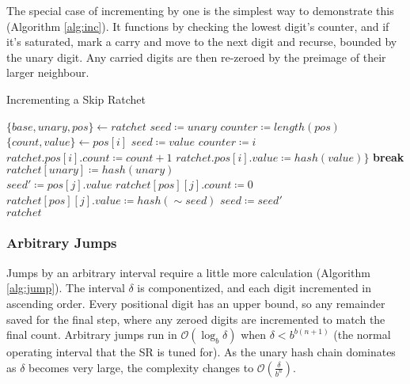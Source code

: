 \documentclass{article}
\begin{document}
	\FloatBarrier
	
	The special case of incrementing by one is the simplest way to demonstrate this (Algorithm \ref{alg:inc}). It functions by checking the lowest digit's counter, and if it's saturated, mark a carry and move to the next digit and recurse, bounded by the unary digit. Any carried digits are then re-zeroed by the preimage of their larger neighbour.
	
	\begin{algorithm}
		\caption{Incrementing a Skip Ratchet}
		\label{alg:inc}

		\begin{algorithmic}[1]
				\State $\{base, unary, pos\} \gets ratchet$
				\State $seed \coloneqq unary$
				\State $counter \coloneqq length(pos)$
				\\
					\State $\{count, value\} \gets pos[i]$
					 
						\State $seed \coloneqq value$
						\State $counter \coloneqq i$
						\State $ratchet.pos[i].count \coloneqq count + 1$ \State $ratchet.pos[i].value \coloneqq hash(value)\}$
						\State \textbf{break}
					\EndIf
				\EndFor
				\\
				 
					\State $ratchet[unary] \coloneqq hash(unary)$
				\EndIf
				\\
					 
						\State $seed' \coloneqq pos[j].value$
						\State $ratchet[pos][j].count \coloneqq 0$
						\State $ratchet[pos][j].value \coloneqq hash(\sim{seed})$
						\State $seed \coloneqq seed'$
					\EndFor
				\EndIf
				\\
				\State $ratchet$
				\EndFunction
		\end{algorithmic}
	\end{algorithm}

	\subsubsection{Arbitrary Jumps}

	Jumps by an arbitrary interval require a little more calculation (Algorithm \ref{alg:jump}). The interval $\delta$ is componentized, and each digit incremented in ascending order. Every positional digit has an upper bound, so any remainder saved for the final step, where any zeroed digits are incremented to match the final count. Arbitrary jumps run in $\mathcal{O}(\log_{b} \delta)$ when $\delta < b^{b(n+1)}$ (the normal operating interval that the SR is tuned for). As the unary hash chain dominates as $\delta$ becomes very large, the complexity changes to $\mathcal{O}(\frac{\delta}{b^{n}})$. %
\end{document}
